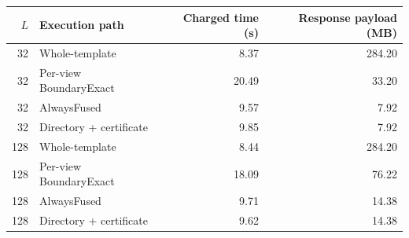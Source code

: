\begin{tabular}{rlrr}\toprule
$L$ & Execution path & Charged time (s) & Response payload (MB) \\
\midrule
32 & Whole-template & 8.37 & 284.20 \\
32 & Per-view BoundaryExact & 20.49 & 33.20 \\
32 & AlwaysFused & 9.57 & 7.92 \\
32 & Directory + certificate & 9.85 & 7.92 \\
128 & Whole-template & 8.44 & 284.20 \\
128 & Per-view BoundaryExact & 18.09 & 76.22 \\
128 & AlwaysFused & 9.71 & 14.38 \\
128 & Directory + certificate & 9.62 & 14.38 \\
\bottomrule\end{tabular}

